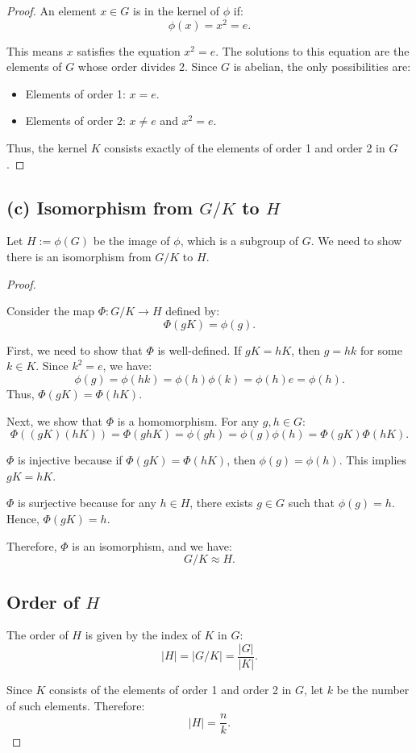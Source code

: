 \documentclass[12pt]{amsart}
\theoremstyle{definition}
\numberwithin{equation}{section}
\begin{document}
\begin{exercise}{5}
\begin{proof}
    An element \(x \in G\) is in the kernel of \(\phi\) if:
    \[
    \phi(x) = x^2 = e.
    \]

    This means \(x\) satisfies the equation \(x^2 = e\). The solutions to this equation are the elements of \(G\) whose order divides 2. Since \(G\) is abelian, the only possibilities are:
    \begin{itemize}
        \item Elements of order 1: \(x = e\).
        \item Elements of order 2: \(x \neq e\) and \(x^2 = e\).
    \end{itemize}

    Thus, the kernel \(K\) consists exactly of the elements of order 1 and order 2 in \(G\).

    \end{proof}

    \subsection*{(c) Isomorphism from \(G/K\) to \(H\)}

    Let \(H := \phi(G)\) be the image of \(\phi\), which is a subgroup of \(G\). We need to show there is an isomorphism from \(G/K\) to \(H\).

    \begin{proof} \( \)

    Consider the map \(\Phi: G/K \rightarrow H\) defined by:
    \[
    \Phi(gK) = \phi(g).
    \]

    First, we need to show that \(\Phi\) is well-defined. If \(gK = hK\), then \(g = hk\) for some \(k \in K\). Since \(k^2 = e\), we have:
    \[
    \phi(g) = \phi(hk) = \phi(h) \phi(k) = \phi(h) e = \phi(h).
    \]
    Thus, \(\Phi(gK) = \Phi(hK)\).

    Next, we show that \(\Phi\) is a homomorphism. For any \(g, h \in G\):
    \[
    \Phi((gK)(hK)) = \Phi(ghK) = \phi(gh) = \phi(g) \phi(h) = \Phi(gK) \Phi(hK).
    \]

    \(\Phi\) is injective because if \(\Phi(gK) = \Phi(hK)\), then \(\phi(g) = \phi(h)\). This implies \(gK = hK\).

    \(\Phi\) is surjective because for any \(h \in H\), there exists \(g \in G\) such that \(\phi(g) = h\). Hence, \(\Phi(gK) = h\).

    Therefore, \(\Phi\) is an isomorphism, and we have:
    \[
    G/K \approx H.
    \]

    \subsection*{Order of \(H\)}

    The order of \(H\) is given by the index of \(K\) in \(G\):
    \[
    |H| = |G/K| = \frac{|G|}{|K|}.
    \]

    Since \(K\) consists of the elements of order 1 and order 2 in \(G\), let \(k\) be the number of such elements. Therefore:
    \[
    |H| = \frac{n}{k}.
    \]

    \end{proof}

\end{exercise}
\newpage
\end{document}
